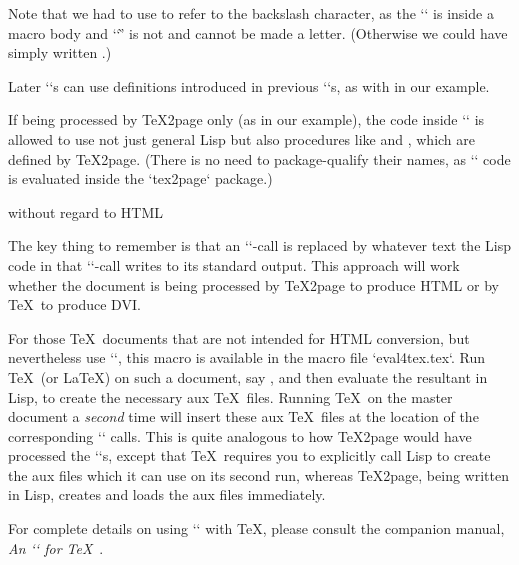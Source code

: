 \begintt
\ifx\shipout\UnDeFiNeD
{}

\def\spaceifnotempty{\eval{
\endtt
\begintts
(let ((x (ungroup (get-token))))
  (unless (all-blanks-p x)
    (princ (code-char 92))
    (princ "space")))
\endtt
\begintt
}}
\fi
\endtt
Note that we had to use  to refer to the
backslash character, as the `\eval` is inside a macro body and ‘`\`’
is not and cannot be made a letter.
(Otherwise we could have simply written .)

Later `\eval`s can
use definitions introduced in previous `\eval`s,
as with  in our example.

If being processed by \TeX2page only (as in our example),
the code inside `\eval` is allowed to use not just general Lisp
but also procedures like
 and , which are defined by
\TeX2page. (There is no need to package-qualify their names, as `\eval`
code is evaluated inside the `tex2page` package.)

 without regard to HTML

%
The key thing to remember is that
an `\eval`-call is replaced by whatever text the
Lisp code in that `\eval`-call writes to its
standard output.  This approach will work whether the
document is being processed by \TeX2page to produce HTML
or by \TeX\ to produce DVI.

For those \TeX\ documents that are not intended for HTML conversion, but
nevertheless use `\eval`, this macro is available in the macro file
`eval4tex.tex`.  Run \TeX\ (or \LaTeX) on such a document, say
, and then evaluate
the resultant  in Lisp, to create the
necessary aux \TeX\ files.  Running \TeX\ on the master document a {\em second}
time will
insert these aux \TeX\ files at the location of the corresponding `\eval`
calls.  This is quite analogous to how \TeX2page would have processed the
`\eval`s, except that \TeX\ requires you to explicitly call Lisp to
create the aux files which it can use on its second run, whereas
\TeX2page, being written in Lisp, creates and loads the aux files
immediately.

For complete details on using `\eval` with
\TeX, please consult the companion manual,
{\em An `\eval` for
\TeX}~\cite{eval4tex}.

